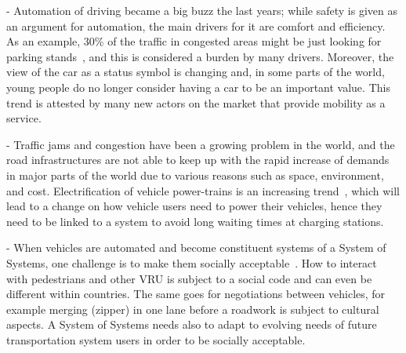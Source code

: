  - Automation of driving became a big buzz the last years; while safety is given as an argument for automation, the main drivers for it are comfort and efficiency. As an example, 30\% of the traffic in congested areas might be just looking for parking stands~\cite{Shoup2011thc}, and this is considered a burden by many drivers. Moreover, the view of the car as a status symbol is changing and, in some parts of the world, young people do no longer consider having a car to be an important value. This trend is attested by many new actors on the market that provide mobility as a service.
 
 - Traffic jams and congestion have been a growing problem in the world, and the road infrastructures are not able to keep up with the rapid increase of demands in major parts of the world due to various reasons such as space, environment, and cost. Electrification of vehicle power-trains is an increasing trend~\cite{KPMG}, which will lead to a change on how vehicle users need to power their vehicles, hence they need to be linked to a system to avoid long waiting times at charging stations.
 
 - When vehicles are automated and become constituent systems of a System of Systems, one challenge is to make them socially acceptable~\cite{vinkhuyzen2016}. How to interact with pedestrians and other VRU is subject to a social code and can even be different within countries. The same goes for negotiations between vehicles, for example merging (zipper) in one lane before a roadwork is subject to cultural aspects. A System of Systems needs also to adapt to evolving needs of future transportation system users in order to be socially acceptable.